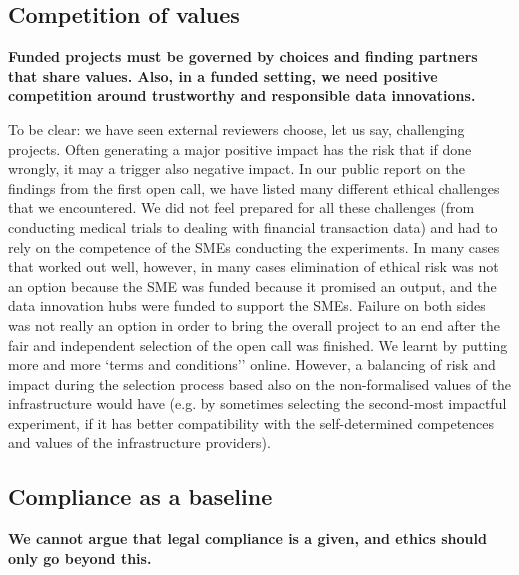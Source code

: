 \documentclass[	DIV=calc,%
							paper=a4,%
							fontsize=11pt,%
							twocolumn, draft]{scrartcl}	 					%
\begin{document}
\subsection{Competition of values}\label{competition-of-values}

\textbf{Funded projects must be governed by choices and finding partners
that share values. Also, in a funded setting, we need positive
competition around trustworthy and responsible data innovations.}

To be clear: we have seen external reviewers choose, let us say,
challenging projects. Often generating a major positive impact has the
risk that if done wrongly, it may a trigger also negative impact. In our
public report on the findings from the first open call, we have listed
many different ethical challenges that we encountered. We did not feel
prepared for all these challenges (from conducting medical trials to
dealing with financial transaction data) and had to rely on the
competence of the SMEs conducting the experiments. In many cases that
worked out well, however, in many cases elimination of ethical risk was
not an option because the SME was funded because it promised an output,
and the data innovation hubs were funded to support the SMEs. Failure on
both sides was not really an option in order to bring the overall
project to an end after the fair and independent selection of the open
call was finished. We learnt by putting more and more `terms and
conditions'' online. However, a balancing of risk and impact during the
selection process based also on the non-formalised values of the
infrastructure would have (e.g. by sometimes selecting the second-most
impactful experiment, if it has better compatibility with the
self-determined competences and values of the infrastructure providers).

\subsection{Compliance as a baseline}\label{compliance-as-a-baseline}

\textbf{We cannot argue that legal compliance is a given, and ethics
should only go beyond this.}
\end{document}
